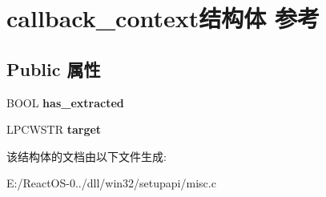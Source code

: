 \hypertarget{structcallback__context}{}\section{callback\+\_\+context结构体 参考}
\label{structcallback__context}
\subsection*{Public 属性}
\begin{DoxyCompactItemize}
\item 
\mbox{\label{structcallback__context_a41293fdee5d00fc6968ee32ea26ad7a6}} 
B\+O\+OL {\bfseries has\+\_\+extracted}
\item 
\mbox{\label{structcallback__context_aeeefd976aa56a8a6b84ba95b05b3d485}} 
L\+P\+C\+W\+S\+TR {\bfseries target}
\end{DoxyCompactItemize}


该结构体的文档由以下文件生成\+:\begin{DoxyCompactItemize}
\item 
E\+:/\+React\+O\+S-\/0../dll/win32/setupapi/misc.\+c\end{DoxyCompactItemize}
